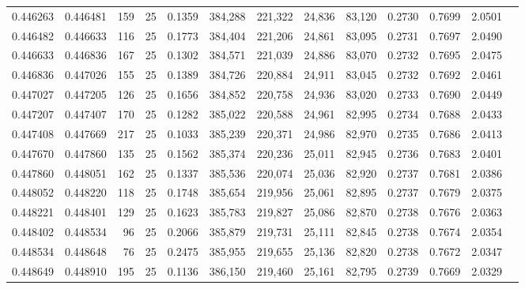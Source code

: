 \begin{tabular}{rrrrrrrrrrrrr}
0.446263 & 0.446481 &   159 &  25 &                                     0.1359 & 384,288 & 221,322 &  24,836 &  83,120 & 0.2730 & 0.7699 & 2.0501 \\
0.446482 & 0.446633 &   116 &  25 &                                     0.1773 & 384,404 & 221,206 &  24,861 &  83,095 & 0.2731 & 0.7697 & 2.0490 \\
0.446633 & 0.446836 &   167 &  25 &                                     0.1302 & 384,571 & 221,039 &  24,886 &  83,070 & 0.2732 & 0.7695 & 2.0475 \\
0.446836 & 0.447026 &   155 &  25 &                                     0.1389 & 384,726 & 220,884 &  24,911 &  83,045 & 0.2732 & 0.7692 & 2.0461 \\
0.447027 & 0.447205 &   126 &  25 &                                     0.1656 & 384,852 & 220,758 &  24,936 &  83,020 & 0.2733 & 0.7690 & 2.0449 \\
0.447207 & 0.447407 &   170 &  25 &                                     0.1282 & 385,022 & 220,588 &  24,961 &  82,995 & 0.2734 & 0.7688 & 2.0433 \\
0.447408 & 0.447669 &   217 &  25 &                                     0.1033 & 385,239 & 220,371 &  24,986 &  82,970 & 0.2735 & 0.7686 & 2.0413 \\
0.447670 & 0.447860 &   135 &  25 &                                     0.1562 & 385,374 & 220,236 &  25,011 &  82,945 & 0.2736 & 0.7683 & 2.0401 \\
0.447860 & 0.448051 &   162 &  25 &                                     0.1337 & 385,536 & 220,074 &  25,036 &  82,920 & 0.2737 & 0.7681 & 2.0386 \\
0.448052 & 0.448220 &   118 &  25 &                                     0.1748 & 385,654 & 219,956 &  25,061 &  82,895 & 0.2737 & 0.7679 & 2.0375 \\
0.448221 & 0.448401 &   129 &  25 &                                     0.1623 & 385,783 & 219,827 &  25,086 &  82,870 & 0.2738 & 0.7676 & 2.0363 \\
0.448402 & 0.448534 &    96 &  25 &                                     0.2066 & 385,879 & 219,731 &  25,111 &  82,845 & 0.2738 & 0.7674 & 2.0354 \\
0.448534 & 0.448648 &    76 &  25 &                                     0.2475 & 385,955 & 219,655 &  25,136 &  82,820 & 0.2738 & 0.7672 & 2.0347 \\
0.448649 & 0.448910 &   195 &  25 &                                     0.1136 & 386,150 & 219,460 &  25,161 &  82,795 & 0.2739 & 0.7669 & 2.0329 \\

\end{tabular}
